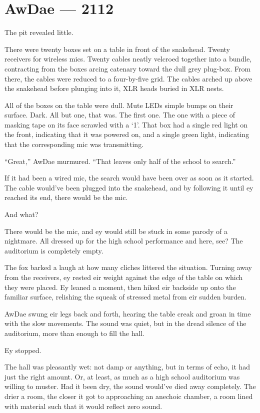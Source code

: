 \chapter*{AwDae — 2112}

The pit revealed little.

There were twenty boxes set on a table in front of the snakehead. Twenty receivers for wireless mics. Twenty cables neatly velcroed together into a bundle, contracting from the boxes arcing catenary toward the dull grey plug-box. From there, the cables were reduced to a four-by-five grid. The cables arched up above the snakehead before plunging into it, XLR heads buried in XLR nests.

All of the boxes on the table were dull. Mute LEDs simple bumps on their surface. Dark. All but one, that was. The first one. The one with a piece of masking tape on its face scrawled with a `1'. That box had a single red light on the front, indicating that it was powered on, and a single green light, indicating that the corresponding mic was transmitting.

``Great,'' AwDae murmured. ``That leaves only half of the school to search.''

If it had been a wired mic, the search would have been over as soon as it started. The cable would've been plugged into the snakehead, and by following it until ey reached its end, there would be the mic.

And what?

There would be the mic, and ey would still be stuck in some parody of a nightmare. All dressed up for the high school performance and here, see? The auditorium is completely empty.

The fox barked a laugh at how many cliches littered the situation. Turning away from the receivers, ey rested eir weight against the edge of the table on which they were placed. Ey leaned a moment, then hiked eir backside up onto the familiar surface, relishing the squeak of stressed metal from eir sudden burden.

AwDae swung eir legs back and forth, hearing the table creak and groan in time with the slow movements. The sound was quiet, but in the dread silence of the auditorium, more than enough to fill the hall.

Ey stopped.

The hall was pleasantly wet: not damp or anything, but in terms of echo, it had just the right amount. Or, at least, as much as a high school auditorium was willing to muster. Had it been dry, the sound would've died away completely. The drier a room, the closer it got to approaching an anechoic chamber, a room lined with material such that it would reflect zero sound.

